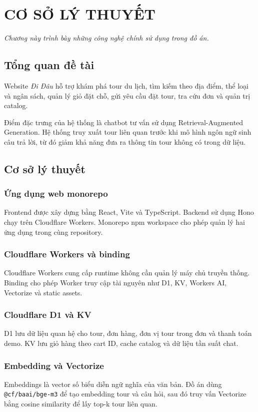 \setcounter{chapter}{0}
\setcounter{section}{0}
\setcounter{table}{0}
\setcounter{figure}{0}
\chapter{CƠ SỞ LÝ THUYẾT}

\textit{Chương này trình bày những công nghệ chính sử dụng trong đồ án.}

\section{Tổng quan đề tài}
Website \emph{Đi Đâu} hỗ trợ khám phá tour du lịch, tìm kiếm theo địa điểm, thể loại và ngân sách, quản lý giỏ đặt chỗ, gửi yêu cầu đặt tour, tra cứu đơn và quản trị catalog.

Điểm đặc trưng của hệ thống là chatbot tư vấn sử dụng Retrieval-Augmented Generation. Hệ thống truy xuất tour liên quan trước khi mô hình ngôn ngữ sinh câu trả lời, từ đó giảm khả năng đưa ra thông tin tour không có trong dữ liệu.

\section{Cơ sở lý thuyết}
\subsection{Ứng dụng web monorepo}
Frontend được xây dựng bằng React, Vite và TypeScript. Backend sử dụng Hono chạy trên Cloudflare Workers. Monorepo npm workspace cho phép quản lý hai ứng dụng trong cùng repository.

\subsection{Cloudflare Workers và binding}
Cloudflare Workers cung cấp runtime không cần quản lý máy chủ truyền thống. Binding cho phép Worker truy cập tài nguyên như D1, KV, Workers AI, Vectorize và static assets.

\subsection{Cloudflare D1 và KV}
D1 lưu dữ liệu quan hệ cho tour, đơn hàng, đơn vị tour trong đơn và thanh toán demo. KV lưu giỏ hàng theo cart ID, cache catalog và dữ liệu tần suất chat.

\subsection{Embedding và Vectorize}
Embeddings là vector số biểu diễn ngữ nghĩa của văn bản. Đồ án dùng \texttt{@cf/baai/bge-m3} để tạo embedding tour và câu hỏi, sau đó truy vấn Vectorize bằng cosine similarity để lấy top-k tour liên quan.

